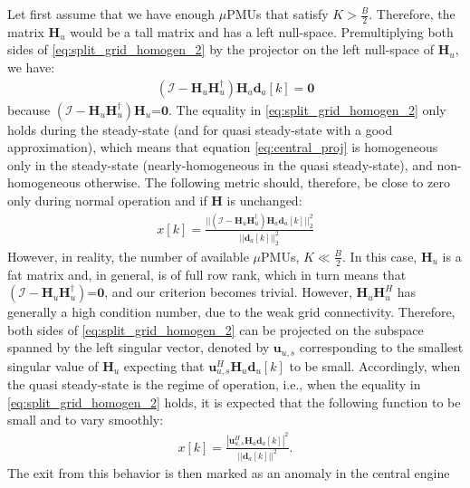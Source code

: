 \documentclass[twocolumn]{IEEEtran}
\newcommand{\mup}{\mu \text{PMU}}
\newcommand{\mb}{\mathbf}
\begin{document}
Let first assume that we have enough $\mup$s that satisfy $K > \frac{B}{2}$. Therefore, the matrix $\mb{H}_u$ would be a tall matrix and has a left null-space. Premultiplying both sides of \eqref{eq:split_grid_homogen_2} by the projector on the left null-space of $\mb{H}_u$, we have:
\begin{align}
(\mathcal{I}-\mb{H}_u \mb{H}^\dagger_u)\mathbf{H}_a\mathbf{d}_a[k]=\mb{0}
\label{eq:central_proj}
\end{align}
because $(\mathcal{I}-\mb{H}_u \mb{H}^\dagger_u)\mathbf{H}_u$=$\mb{0}$. The equality in \eqref{eq:split_grid_homogen_2} only holds during the steady-state (and for quasi steady-state with a good approximation), which means that equation \eqref{eq:central_proj} is homogeneous only in the steady-state (nearly-homogeneous in the quasi steady-state), and non-homogeneous otherwise. The following metric should, therefore, be close to zero only during normal operation and if $\mathbf{H}$
is unchanged:
\begin{align}
x[k]=\frac{||(\mathcal{I}-\mathbf{H}_u\mathbf{H}_u^\dagger)\mathbf{H}_a\mathbf{d}_a[k]||_2^2}{||\mb{d}_a[k]||_2^2}
\end{align}
However, in reality, the number of available $\mup$s, $K \ll \frac{B}{2}$. In this case, $\mb{H}_u$ is a fat matrix and, in general, is of full row rank, which in turn means that $(\mathcal{I}-\mathbf{H}_u\mathbf{H}_u^\dagger)$=$\mb{0}$, and our criterion becomes trivial. However, $\mb{H}_u\mb{H}^H_u$ has generally a high condition number, due to the weak grid connectivity. Therefore, both sides of \eqref{eq:split_grid_homogen_2} can be projected on the subspace spanned by the left singular vector, denoted by $\mb{u}_{u,s}$ corresponding to the smallest singular value of $\mb{H}_u$ expecting that $\mb{u}^H_{u,s}\mathbf{H}_u\mathbf{d}_u[k]$ to be small.
Accordingly, when the quasi steady-state is the regime of operation, i.e., when the equality in \eqref{eq:split_grid_homogen_2} holds, it is expected that the following function to be small and to vary smoothly:
\begin{align}
x[k]=\frac{|\mathbf{u}^H_{u,s}\mathbf{H}_a\mathbf{d}_a[k]|^2}{||\mathbf{d}_a[k]||^2}.
\label{eq:xopt2}
\end{align}
The exit from this behavior is then marked as an anomaly in the central engine 
\end{document}
